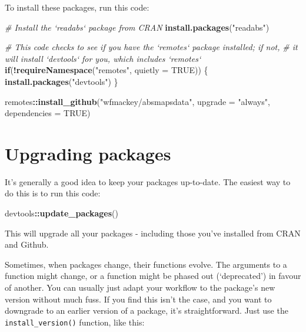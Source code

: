 \documentclass[]{book}
\newenvironment{Shaded}{\begin{snugshade}}{\end{snugshade}}
\newcommand{\CommentTok}[1]{\textcolor[rgb]{0.56,0.35,0.01}{\textit{#1}}}
\newcommand{\ControlFlowTok}[1]{\textcolor[rgb]{0.13,0.29,0.53}{\textbf{#1}}}
\newcommand{\DataTypeTok}[1]{\textcolor[rgb]{0.13,0.29,0.53}{#1}}
\newcommand{\KeywordTok}[1]{\textcolor[rgb]{0.13,0.29,0.53}{\textbf{#1}}}
\newcommand{\NormalTok}[1]{#1}
\newcommand{\OperatorTok}[1]{\textcolor[rgb]{0.81,0.36,0.00}{\textbf{#1}}}
\newcommand{\OtherTok}[1]{\textcolor[rgb]{0.56,0.35,0.01}{#1}}
\newcommand{\StringTok}[1]{\textcolor[rgb]{0.31,0.60,0.02}{#1}}
\begin{document}
To install these packages, run this code:

\begin{Shaded}
\begin{Highlighting}[]
\CommentTok{# Install the `readabs` package from CRAN}
\KeywordTok{install.packages}\NormalTok{(}\StringTok{"readabs"}\NormalTok{)}

\CommentTok{# This code checks to see if you have the `remotes` package installed; if not,}
\CommentTok{# it will install `devtools` for you, which includes `remotes`}
\ControlFlowTok{if}\NormalTok{(}\OperatorTok{!}\KeywordTok{requireNamespace}\NormalTok{(}\StringTok{"remotes"}\NormalTok{, }\DataTypeTok{quietly =} \OtherTok{TRUE}\NormalTok{)) \{}
  \KeywordTok{install.packages}\NormalTok{(}\StringTok{"devtools"}\NormalTok{)}
\NormalTok{\}}

\NormalTok{remotes}\OperatorTok{::}\KeywordTok{install_github}\NormalTok{(}\StringTok{"wfmackey/absmapsdata"}\NormalTok{,}
                        \DataTypeTok{upgrade =} \StringTok{"always"}\NormalTok{,}
                        \DataTypeTok{dependencies =} \OtherTok{TRUE}\NormalTok{)}
\end{Highlighting}
\end{Shaded}

\hypertarget{upgrading-packages}{%
\section{Upgrading packages}\label{upgrading-packages}}

It's generally a good idea to keep your packages up-to-date. The easiest way to do this is to run this code:

\begin{Shaded}
\begin{Highlighting}[]
\NormalTok{devtools}\OperatorTok{::}\KeywordTok{update_packages}\NormalTok{()}
\end{Highlighting}
\end{Shaded}

This will upgrade all your packages - including those you've installed from CRAN and Github.

Sometimes, when packages change, their functions evolve. The arguments to a function might change, or a function might be phased out (`deprecated') in favour of another. You can usually just adapt your workflow to the package's new version without much fuss. If you find this isn't the case, and you want to downgrade to an earlier version of a package, it's straightforward. Just use the \texttt{install\_version()} function, like this:
\end{document}
